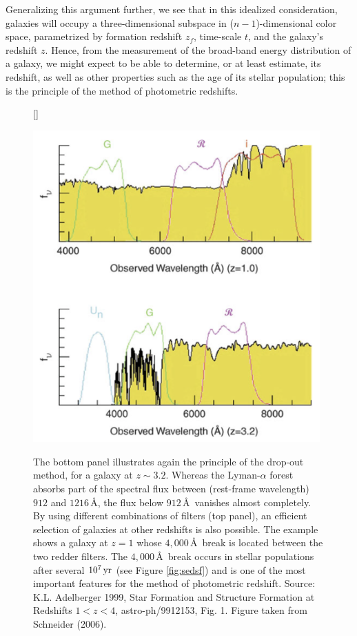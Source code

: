\documentclass[a4paper,11pt]{article}
\begin{document}
{\noindent}Generalizing this argument further, we see that in this idealized consideration, galaxies will occupy a three-dimensional subspace in ($n-1$)-dimensional color space, parametrized by formation redshift $z_f$, time-scale $t$, and the galaxy’s redshift $z$. Hence, from the measurement of the broad-band energy distribution of a galaxy, we might expect to be able to determine, or at least estimate, its redshift, as well as other properties such as the age of its stellar population; this is the principle of the method of photometric redshifts.

\begin{figure}[h]
    [\FBwidth]
    {\caption{\footnotesize{The bottom panel illustrates again the principle of the drop-out method, for a galaxy at $z\sim3.2$. Whereas the Lyman-$\alpha$ forest absorbs part of the spectral flux between (rest-frame wavelength) $912$ and $1216$\,\AA, the flux below $912$\,\AA~vanishes almost completely. By using different combinations of filters (top panel), an efficient selection of galaxies at other redshifts is also possible. The example shows a galaxy at $z=1$ whose $4,000$\,\AA~break is located between the two redder filters. The $4,000$\,\AA~break occurs in stellar populations after several $10^7\,{\rm yr}$ (see Figure \ref{fig:sedsf}) and is one of the most important features for the method of photometric redshift. Source: K.L. Adelberger 1999, Star Formation and Structure Formation at Redshifts $1<z<4$, astro-ph/9912153, Fig. 1. Figure taken from Schneider (2006).}}
    \label{fig:photredshifts}}
    {\includegraphics[width=11cm]{figures/PhotRedshifts.png}}
\end{figure}
\end{document}
